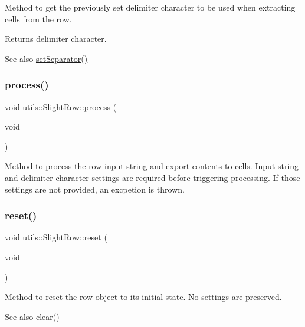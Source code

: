 Method to get the previously set delimiter character to be used when extracting cells from the row. \begin{DoxyReturn}{Returns}
delimiter character. 
\end{DoxyReturn}
\begin{DoxySeeAlso}{See also}
\hyperlink{classutils_1_1SlightRow_ad26f06a994890c68fedb45ba1e95f25d}{set\+Separator()} 
\end{DoxySeeAlso}
\mbox{\label{classutils_1_1SlightRow_a9774969c2a0276491ab368216c2592a0}} 
\subsubsection{\texorpdfstring{process()}{process()}}
{\footnotesize\ttfamily void utils\+::\+Slight\+Row\+::process (\begin{DoxyParamCaption}\item[{void}]{ }\end{DoxyParamCaption})}

Method to process the row input string and export contents to cells. Input string and delimiter character settings are required before triggering processing. If those settings are not provided, an excpetion is thrown. \mbox{\label{classutils_1_1SlightRow_ad323829080b35608b2e5764ed735d4dc}} 
\subsubsection{\texorpdfstring{reset()}{reset()}}
{\footnotesize\ttfamily void utils\+::\+Slight\+Row\+::reset (\begin{DoxyParamCaption}\item[{void}]{ }\end{DoxyParamCaption})}

Method to reset the row object to its initial state. No settings are preserved. \begin{DoxySeeAlso}{See also}
\hyperlink{classutils_1_1SlightRow_abd5fa1b875373906c801611a9e051c31}{clear()} 
\end{DoxySeeAlso}
\mbox{\label{classutils_1_1SlightRow_abdee6f0ba2d0e6ce32cc8e21020f2218}} 
